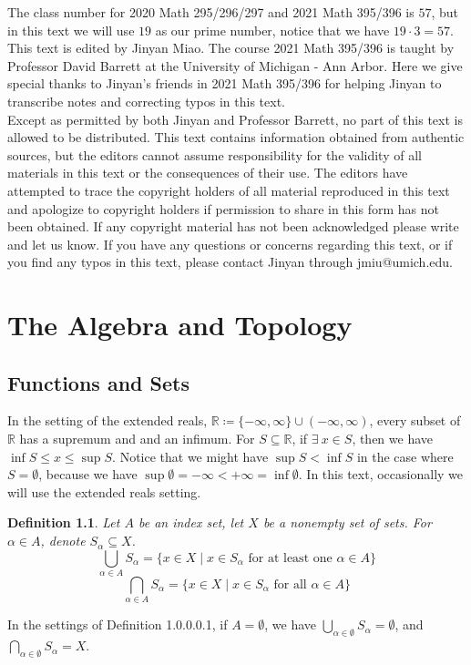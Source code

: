 \documentclass[15pt]{book}
\theoremstyle{break}
\theoremstyle{break}
\newtheorem{defn}{Definition}[corL]
\newcommand{\R}{\mathbb{R}}
\begin{document}
The class number for 2020 Math 295/296/297 and 2021 Math 395/396 is $57$, but in this text we will use $19$ as our prime number, notice that we have $19\cdot 3 = 57$.\\

This text is edited by Jinyan Miao. The course 2021 Math 395/396 is taught by Professor David Barrett at the University of Michigan - Ann Arbor. Here we give special thanks to Jinyan's friends in 2021 Math 395/396 for helping Jinyan to transcribe notes and correcting typos in this text.\\ 

Except as permitted by both Jinyan and Professor Barrett, no part of this text is allowed to be distributed. This text contains information obtained from authentic sources, but the editors cannot assume responsibility for the validity of all materials in this text or the consequences of their use. The editors have attempted to trace the copyright holders of all material reproduced in this text and apologize to copyright holders if permission to share in this form has not been obtained. If any copyright material has not been acknowledged please write and let us know. If you have any questions or concerns regarding this text, or if you find any typos in this text, please contact Jinyan through jmiu@umich.edu. 


\newpage
\chapter{The Algebra and Topology}

\section[Functions and Sets]{\color{red} Functions and Sets \color{black}}
In the setting of the extended reals, $\R \coloneqq \{-\infty, \infty\}\cup (-\infty, \infty)$, every subset of $\R$ has a supremum and and an infimum. For $S\subseteq \R$, if $\exists\ x \in S$, then we have $\inf S\leq x\leq \sup S$. Notice that we might have $\sup S < \inf S$ in the case where $S = \emptyset$, because we have $\sup \emptyset = -\infty < +\infty = \inf \emptyset$. In this text, occasionally we will use the extended reals setting.\\

\begin{defn}
Let $A$ be an index set, let $X$ be a nonempty set of sets. For $\alpha \in A$, denote $S_\alpha \subseteq X$. $$\bigcup_{\alpha \in A} S_\alpha = \{ x \in X\mid x \in S_\alpha \text{ for at least one } \alpha \in A\}$$
$$\bigcap_{\alpha \in A} S_\alpha = \{x\in X \mid x \in S_\alpha \text{ for all } \alpha \in A\}$$
\end{defn}
In the settings of Definition 1.0.0.0.1, if $A =\emptyset$, we have $\bigcup_{\alpha \in \emptyset}S_\alpha = \emptyset$, and $\bigcap_{\alpha \in \emptyset}S_\alpha = X$.\\
\end{document}
